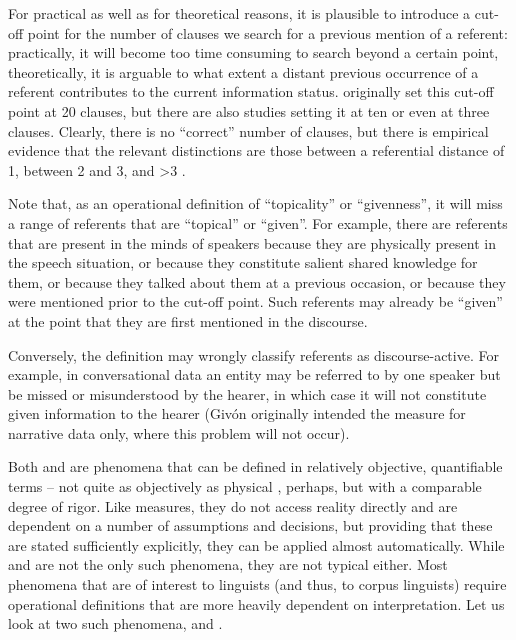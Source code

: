 For practical as well as for theoretical reasons, it is plausible to introduce a cut-off point for the number of clauses we search for a previous mention of a referent: practically, it will become too time consuming to search beyond a certain point, theoretically, it is arguable to what extent a distant previous occurrence of a referent contributes to the current information status. \citet{givon_topic_1983} originally set this cut-off point at 20 clauses, but there are also studies setting it at ten or even at three clauses. Clearly, there is no ``correct'' number of clauses, but there is empirical evidence that the relevant distinctions are those between a referential distance of 1, between 2 and 3, and >3 \citep[cf.][]{givon_grammar_1992}.

Note that, as an operational definition of ``topicality'' or ``givenness'', it will miss a range of referents that are ``topical'' or ``given''. For example, there are referents that are present in the minds of speakers because they are physically present in the speech situation, or because they constitute salient shared knowledge for them, or because they talked about them at a previous occasion, or because they were mentioned prior to the cut-off point. Such referents may already be ``given'' at the point that they are first mentioned in the discourse.

Conversely, the definition may wrongly classify referents as discourse-active. For example, in conversational data an entity may be referred to by one speaker but be missed or misunderstood by the hearer, in which case it will not constitute given information to the hearer (Givón originally intended the measure for narrative data only, where this problem will not occur).

Both  and  are phenomena that can be defined in relatively objective, quantifiable terms -- not quite as objectively as physical , perhaps, but with a comparable degree of rigor. Like  measures, they do not access reality directly and are dependent on a number of assumptions and decisions, but providing that these are stated sufficiently explicitly, they can be applied almost automatically. While  and  are not the only such phenomena, they are not typical either. Most phenomena that are of interest to linguists (and thus, to corpus linguists) require operational definitions that are more heavily dependent on interpretation. Let us look at two such phenomena,  and .

